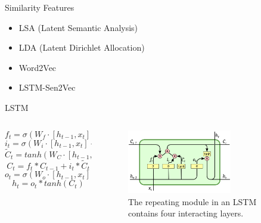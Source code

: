 \documentclass{beamer}
\begin{document}
    \begin{frame}{Similarity Features}
      \begin{itemize}
        \item LSA (Latent Semantic Analysis)
        \item LDA (Latent Dirichlet Allocation)
        \item Word2Vec
        \item LSTM-Sen2Vec
      \end{itemize}
    \end{frame}

    \begin{frame}{LSTM}
      \begin{columns}
      \begin{column}[t]{0.6\textwidth}
        \begin{equation}
           f_t = \sigma(W_f \cdot [h_{t-1}, x_t] + b_f)
        \end{equation}
        \begin{equation}
           i_t = \sigma(W_i \cdot [h_{t-1}, x_t] + b_i)
        \end{equation}
        \begin{equation}
           \tilde{C}_t = tanh(W_C \cdot [h_{t-1}, x_t] + b_C) 
        \end{equation}
        \begin{equation}
           C_t = f_t * C_{t-1} + i_t * \tilde{C}_t
        \end{equation}
        \begin{equation}
           o_t = \sigma(W_o \cdot [h_{t-1}, x_t] + b_o)
        \end{equation}
        \begin{equation}
           h_t = o_t * tanh(C_t)
        \end{equation}
      \end{column}

      \begin{column}[t]{0.4\textwidth}
        \begin{figure}
        \includegraphics[width=1.8in,height=1.1in]{lstm2.png}
        \caption{The repeating module in an LSTM contains four interacting layers.}
        \end{figure}
      \end{column}

      \end{columns}
      
    \end{frame}
\end{document}
